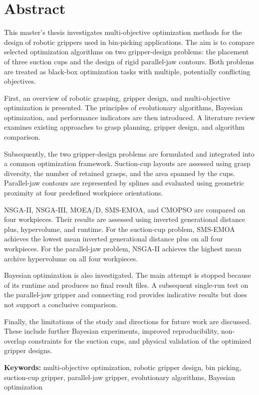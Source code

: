 \chapter*{Abstract}

This master's thesis investigates multi-objective optimization methods
for the design of robotic grippers used in bin-picking applications.
The aim is to compare selected optimization algorithms on two
gripper-design problems: the placement of three suction cups and the
design of rigid parallel-jaw contours. Both problems are treated as
black-box optimization tasks with multiple, potentially conflicting
objectives.

First, an overview of robotic grasping, gripper design, and
multi-objective optimization is presented. The principles of
evolutionary algorithms, Bayesian optimization, and performance
indicators are then introduced. A literature review examines existing
approaches to grasp planning, gripper design, and algorithm comparison.

Subsequently, the two gripper-design problems are formulated and
integrated into a common optimization framework. Suction-cup layouts
are assessed using grasp diversity, the number of retained grasps, and
the area spanned by the cups. Parallel-jaw contours are represented
by splines and evaluated using geometric proximity at four predefined
workpiece orientations.

NSGA-II, NSGA-III, MOEA/D, SMS-EMOA, and CMOPSO are compared on four
workpieces. Their results are assessed using inverted generational
distance plus, hypervolume, and runtime. For the suction-cup problem,
SMS-EMOA achieves the lowest mean inverted generational distance plus
on all four workpieces. For the parallel-jaw problem, NSGA-II achieves
the highest mean archive hypervolume on all four workpieces.

Bayesian optimization is also investigated. The main attempt is stopped
because of its runtime and produces no final result files. A subsequent
single-run test on the parallel-jaw gripper and connecting rod provides
indicative results but does not support a conclusive comparison.

Finally, the limitations of the study and directions for future work
are discussed. These include further Bayesian experiments, improved
reproducibility, non-overlap constraints for the suction cups, and
physical validation of the optimized gripper designs.

\vspace{1em}
\noindent\textbf{Keywords:} multi-objective optimization, robotic
gripper design, bin picking, suction-cup gripper, parallel-jaw gripper, evolutionary algorithms, Bayesian
optimization

\newpage